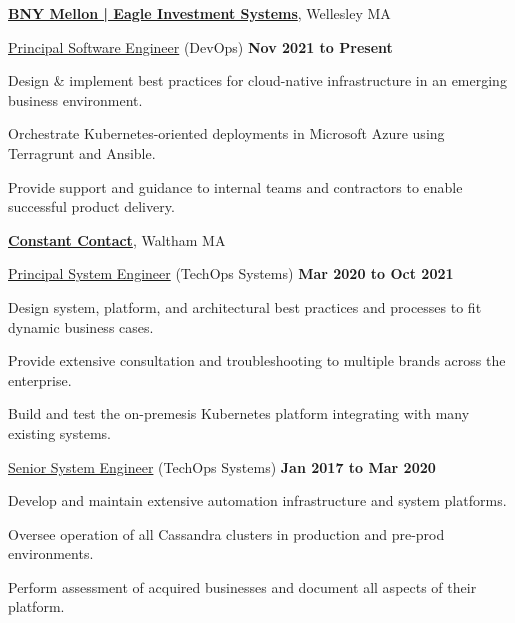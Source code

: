 \documentclass[10pt]{article}
\renewcommand\textit[1]{\underline{#1}}
\newcommand{\halfblankline}{\quad\vspace{-0.5\baselineskip}\pagebreak[3]}
\begin{document}
\href{https://www.bnymellon.com/us/en/solutions/asset-managers/data-analytics.html}{\textbf{BNY Mellon | Eagle Investment Systems}},
Wellesley MA
\begin{outerlist}
	\item[] \textit{Principal Software Engineer} (DevOps)
        \hfill \textbf{Nov 2021 to Present}
	\begin{innerlist}
		\item Design \& implement best practices for cloud-native infrastructure in an emerging business environment.
		\item Orchestrate Kubernetes-oriented deployments in Microsoft Azure using Terragrunt and Ansible.
		\item Provide support and guidance to internal teams and contractors to enable successful product delivery.
        \end{innerlist}
\end{outerlist}
\halfblankline

\href{https://www.constantcontact.com/}{\textbf{Constant Contact}},
Waltham MA
\begin{outerlist}
	\item[] \textit{Principal System Engineer} (TechOps Systems)
        \hfill \textbf{Mar 2020 to Oct 2021}
	\begin{innerlist}
		\item Design system, platform, and architectural best practices and processes to fit dynamic business cases.
		\item Provide extensive consultation and troubleshooting to multiple brands across the enterprise.
		\item Build and test the on-premesis Kubernetes platform integrating with many existing systems.
        \end{innerlist}

	\item[] \textit{Senior System Engineer} (TechOps Systems)
        \hfill \textbf{Jan 2017 to Mar 2020}
	\begin{innerlist}
		\item Develop and maintain extensive automation infrastructure and system platforms.
		\item Oversee operation of all Cassandra clusters in production and pre-prod environments.
		\item Perform assessment of acquired businesses and document all aspects of their platform.
        \end{innerlist}
\end{outerlist}
\halfblankline
\end{document}
